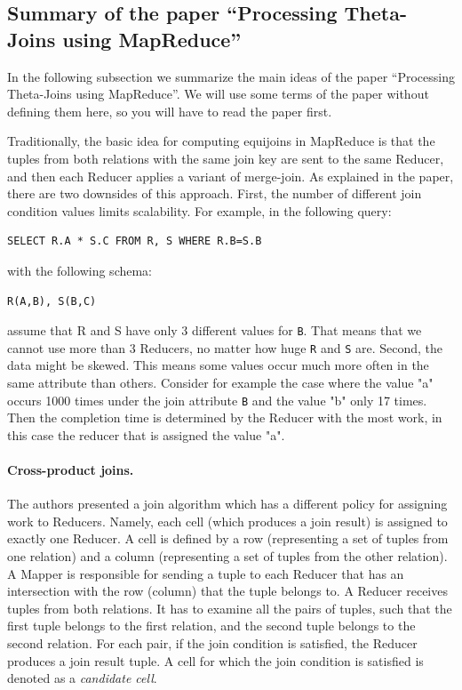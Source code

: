 \documentclass[a4paper,10pt]{article}
\begin{document}
\subsection{Summary of the paper ``Processing Theta-Joins using MapReduce''}
\label{Foundations}

In the following subsection we summarize the main ideas of the paper ``Processing Theta-Joins using MapReduce''. We will use some terms of the paper without defining them here, so you will have to read the paper first.

Traditionally, the basic idea for computing equijoins in MapReduce is that the tuples from both relations with the same join key are sent to the same Reducer, and then each Reducer applies a variant of merge-join. As explained in the paper, there are two downsides of this approach. First, the number of different join condition values limits scalability. For example, in the following query:
\begin{verbatim}
SELECT R.A * S.C FROM R, S WHERE R.B=S.B
\end{verbatim}
with the following schema:
\begin{verbatim}
R(A,B), S(B,C)
\end{verbatim}
assume that R and S have only 3 different values for \verb|B|. That means that we cannot use more than 3 Reducers, no matter how huge \verb|R| and \verb|S| are. Second, the data might be skewed. This means some values occur much more often in the same attribute than others. Consider for example the case where the value "a" occurs 1000 times under the join attribute \verb|B| and the value "b" only 17 times. Then the completion time is determined by the Reducer with the most work, in this case the reducer that is assigned the value "a".


\paragraph{Cross-product joins.} The authors presented a join algorithm which has a different policy for assigning work to Reducers. Namely, each cell (which produces a join result) is assigned to exactly one Reducer. A cell is defined by a row (representing a set of tuples from one relation) and a column (representing a set of tuples from the other relation). A Mapper is responsible for sending a tuple to each Reducer that has an intersection with the row (column) that the tuple belongs to. A Reducer receives tuples from both relations. It has to examine all the pairs of tuples, such that the first tuple belongs to the first relation, and the second tuple belongs to the second relation. For each pair, if the join condition is satisfied, the Reducer produces a join result tuple. A cell for which the join condition is satisfied is denoted as a \textit{candidate cell}.
\end{document}
